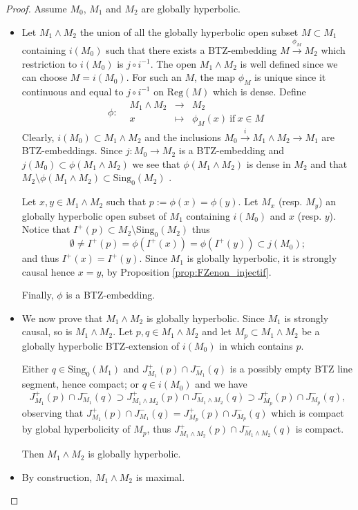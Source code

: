 \documentclass[a4paper,12pt]{article}
\def\sing{\mathrm{Sing}}
\def\Reg{\mathrm{Reg}}
\def\pgcd{M_1\wedge M_2}
\def\reg{\Reg}
\newcommand{\fonction}[5]{\displaystyle#1:\begin{array}{l|rcl}
& \displaystyle #2 & \longrightarrow & \displaystyle #3 \\
    & \displaystyle #4 & \longmapsto & \displaystyle #5 \end{array}}
\begin{document}
	
		\begin{proof} Assume $M_0$, $M_1$ and $M_2$ are globally hyperbolic.
		\begin{itemize}
			\item Let $\pgcd$ the union of all the globally hyperbolic open subset $M\subset M_1$ containing $i(M_0)$ such that there exists a BTZ-embedding $M\xrightarrow{\phi_M} M_2$ which restriction to $i(M_0)$ is $j\circ i^{-1}$. The open $M_1\wedge M_2$ is well defined since we can choose $M=i(M_0)$.
				For such an $M$, the map $\phi_M$ is unique since it continuous and equal to $j\circ i^{-1}$ on $\reg(M)$ which is dense. Define $$\fonction{\phi}{\pgcd}{M_2}{x}{\phi_M(x) \mathrm{~if~} x \in M}$$
				Clearly, $i(M_0)\subset \pgcd$ and the inclusions $M_0\xrightarrow{i}\pgcd \rightarrow M_1$ are BTZ-embeddings.
				Since $j: M_0 \rightarrow M_2$ is a BTZ-embedding and $j(M_0)\subset \phi(\pgcd)$  we see that $\phi(\pgcd)$ is dense in $M_2$ and that $M_2\setminus\phi(\pgcd) \subset \sing_0(M_2)$  .
				
				Let $x,y \in \pgcd$ such that $p:=\phi(x)=\phi(y)$.
				Let $M_x$ (resp. $M_y$) an globally hyperbolic open subset of $M_1$ containing $i(M_0)$ and $x$ (resp. $y$).
				Notice that $I^+(p)\subset M_2\setminus\sing_0(M_2)$ thus
				$$\emptyset\neq I^+(p)=\phi(I^+(x))=\phi(I^+(y))\subset j(M_0);$$
				and thus $I^+(x)=I^+(y)$. Since $M_1$ is globally hyperbolic, it is strongly causal hence $x=y$, by Proposition \ref{prop:FZenon_injectif}.
				
				Finally, $\phi$ is a  BTZ-embedding.
			
				
			\item 	We now prove that $M_1 \wedge M_2$ is globally hyperbolic. Since $M_1$ is strongly causal, so is $\pgcd$. Let $p, q \in M_1 \wedge M_2$ and let $M_p\subset M_1 \wedge M_2$ be a globally hyperbolic BTZ-extension of $i(M_0)$ in  which contains $p$.
			
			Either $q \in \sing_0(M_1)$ and
					$J^+_{M_1}(p)\cap J^-_{M_1}(q)$ is a possibly empty BTZ line segment, hence compact; or $q\in i(M_0)$ and we have $$J^+_{M_1}(p)\cap J^-_{M_1}(q) \supset J^+_{\pgcd}(p)\cap J^-_{\pgcd}(q)\supset J^+_{M_p}(p)\cap J^-_{M_p}(q),$$
					observing that 
					$J^+_{M_1}(p)\cap J^-_{M_1}(q) = J^+_{M_p}(p)\cap J^-_{M_p}(q)$ which is compact by global hyperbolicity of $M_p$, thus $J^+_{\pgcd}(p)\cap J^-_{\pgcd}(q)$ is compact.
					
					
					
				Then $M_1\wedge M_2$ is globally hyperbolic.
				
				
			\item By construction, $\pgcd$ is maximal.
		\end{itemize}
      \end{proof}
\end{document}
